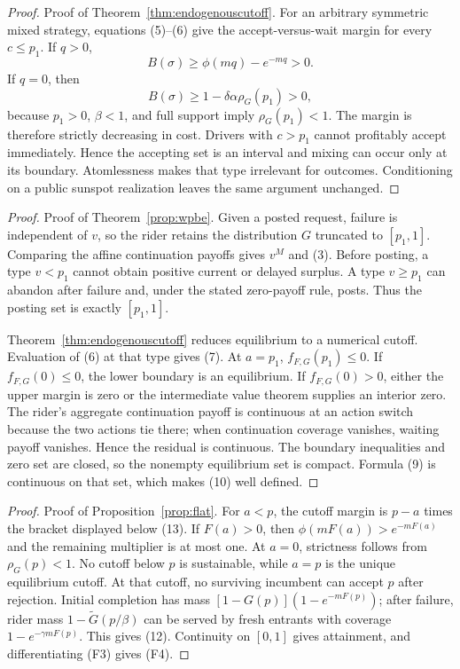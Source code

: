 \documentclass[mnsc,blindrev]{informs3}
\newcommand{\ph}{\phi}
\begin{document}
\begin{proof}{Proof of Theorem~\ref{thm:endogenouscutoff}.}
For an arbitrary symmetric mixed strategy, equations (5)--(6) give the
accept-versus-wait margin for every \(c\le p_1\).  If \(q>0\),
\[
 B(\sigma)\ge\ph(mq)-e^{-mq}>0.
\]
If \(q=0\), then
\[
 B(\sigma)\ge1-\delta\alpha\rho_G(p_1)>0,
\]
because \(p_1>0\), \(\beta<1\), and full support imply
\(\rho_G(p_1)<1\).  The margin is therefore strictly decreasing in cost.
Drivers with \(c>p_1\) cannot profitably accept immediately.  Hence the
accepting set is an interval and mixing can occur only at its boundary.
Atomlessness makes that type irrelevant for outcomes.  Conditioning on a
public sunspot realization leaves the same argument unchanged.
\Halmos\end{proof}

\begin{proof}{Proof of Theorem~\ref{prop:wpbe}.}
Given a posted request, failure is independent of \(v\), so the rider retains
the distribution \(G\) truncated to \([p_1,1]\).  Comparing the affine
continuation payoffs gives \(v^M\) and (3).  Before posting, a type \(v<p_1\)
cannot obtain positive current or delayed surplus.  A type \(v\ge p_1\) can
abandon after failure and, under the stated zero-payoff rule, posts.  Thus the
posting set is exactly \([p_1,1]\).

Theorem~\ref{thm:endogenouscutoff} reduces equilibrium to a numerical cutoff.
Evaluation of (6) at that type gives (7).  At \(a=p_1\),
\(f_{F,G}(p_1)\le0\).  If \(f_{F,G}(0)\le0\), the lower boundary is an
equilibrium.  If \(f_{F,G}(0)>0\), either the upper margin is zero or the
intermediate value theorem supplies an interior zero.  The rider's aggregate
continuation payoff is continuous at an action switch because the two actions
tie there; when continuation coverage vanishes, waiting payoff vanishes.
Hence the residual is continuous.  The boundary inequalities and zero set are
closed, so the nonempty equilibrium set is compact.  Formula (9) is continuous
on that set, which makes (10) well defined.
\Halmos\end{proof}

\begin{proof}{Proof of Proposition~\ref{prop:flat}.}
For \(a<p\), the cutoff margin is \(p-a\) times the bracket displayed below
(13).  If \(F(a)>0\), then
\(\ph(mF(a))>e^{-mF(a)}\) and the remaining multiplier is at most one.
At \(a=0\), strictness follows from \(\rho_G(p)<1\).  No cutoff below \(p\)
is sustainable, while \(a=p\) is the unique equilibrium cutoff.  At that cutoff,
no surviving incumbent can accept \(p\) after rejection.  Initial completion
has mass \([1-G(p)](1-e^{-mF(p)})\); after failure, rider mass
\(1-\widetilde G(p/\beta)\) can be served by fresh entrants with coverage
\(1-e^{-\gamma mF(p)}\).  This gives (12).  Continuity on \([0,1]\) gives
attainment, and differentiating (F3) gives (F4).
\Halmos\end{proof}
\end{document}
